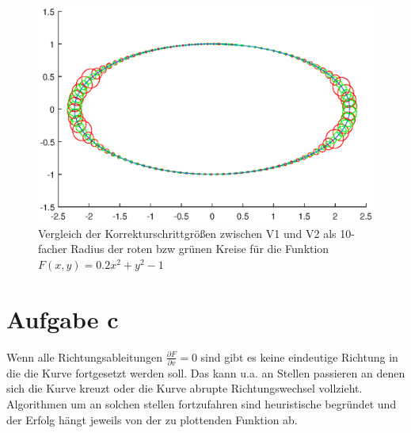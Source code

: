 \documentclass[a4paper,11pt,bibliography=totoc,listof=totoc,headinclude=true,cleardoublepage=empty,oneside]{scrartcl}
\newcommand{\diff}[2]{\frac{\partial #1}{\partial #2}}
\begin{document}
\begin{figure}
	\centering
	\includegraphics[width=0.75\linewidth]{plots/B/VergleichKorrektur.eps}
	\caption{Vergleich der Korrekturschrittgrößen zwischen V1 und V2 als 10-facher Radius der roten bzw grünen Kreise für die Funktion $F(x,y) = 0.2x^2+y^2-1$}
	\label{fig:KorrVergleich_b}
\end{figure}
\linebreak
\section{Aufgabe c}
Wenn alle Richtungsableitungen $\diff{F}{v} = 0$ sind gibt es keine eindeutige Richtung in die die Kurve fortgesetzt werden soll. Das kann u.a. an Stellen passieren an denen sich die Kurve kreuzt oder die Kurve abrupte Richtungswechsel vollzieht. Algorithmen um an solchen stellen fortzufahren sind heuristische begründet und der Erfolg hängt jeweils von der zu plottenden Funktion ab. 
\end{document}
